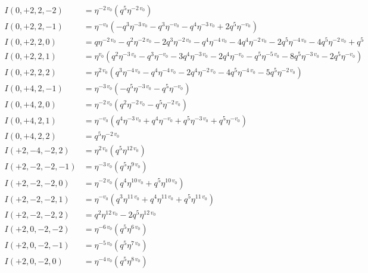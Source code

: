 \documentclass[11pt,a4paper]{article}
\begin{document}
\begin{align*}
I(0, +2, 2, -2) &= \eta^{-2 \, v_{0}} \left( q^{5} \eta^{-2 \, v_{0}} \right) \\
I(0, +2, 2, -1) &= \eta^{-v_{0}} \left( -q^{3} \eta^{-3 \, v_{0}} - q^{3} \eta^{-v_{0}} - q^{4} \eta^{-3 \, v_{0}} + 2 q^{5} \eta^{-v_{0}} \right) \\
I(0, +2, 2, 0) &= q \eta^{-2 \, v_{0}} - q^{2} \eta^{-2 \, v_{0}} - 2 q^{3} \eta^{-2 \, v_{0}} - q^{4} \eta^{-4 \, v_{0}} - 4 q^{4} \eta^{-2 \, v_{0}} - 2 q^{5} \eta^{-4 \, v_{0}} - 4 q^{5} \eta^{-2 \, v_{0}} + q^{5} \\
I(0, +2, 2, 1) &= \eta^{v_{0}} \left( q^{2} \eta^{-3 \, v_{0}} - q^{3} \eta^{-v_{0}} - 3 q^{4} \eta^{-3 \, v_{0}} - 2 q^{4} \eta^{-v_{0}} - q^{5} \eta^{-5 \, v_{0}} - 8 q^{5} \eta^{-3 \, v_{0}} - 2 q^{5} \eta^{-v_{0}} \right) \\
I(0, +2, 2, 2) &= \eta^{2 \, v_{0}} \left( q^{3} \eta^{-4 \, v_{0}} - q^{4} \eta^{-4 \, v_{0}} - 2 q^{4} \eta^{-2 \, v_{0}} - 4 q^{5} \eta^{-4 \, v_{0}} - 5 q^{5} \eta^{-2 \, v_{0}} \right) \\
I(0, +4, 2, -1) &= \eta^{-3 \, v_{0}} \left( -q^{5} \eta^{-3 \, v_{0}} - q^{5} \eta^{-v_{0}} \right) \\
I(0, +4, 2, 0) &= \eta^{-2 \, v_{0}} \left( q^{2} \eta^{-2 \, v_{0}} - q^{5} \eta^{-2 \, v_{0}} \right) \\
I(0, +4, 2, 1) &= \eta^{-v_{0}} \left( q^{4} \eta^{-3 \, v_{0}} + q^{4} \eta^{-v_{0}} + q^{5} \eta^{-3 \, v_{0}} + q^{5} \eta^{-v_{0}} \right) \\
I(0, +4, 2, 2) &= q^{5} \eta^{-2 \, v_{0}} \\
I(+2, -4, -2, 2) &= \eta^{2 \, v_{0}} \left( q^{5} \eta^{12 \, v_{0}} \right) \\
I(+2, -2, -2, -1) &= \eta^{-3 \, v_{0}} \left( q^{5} \eta^{9 \, v_{0}} \right) \\
I(+2, -2, -2, 0) &= \eta^{-2 \, v_{0}} \left( q^{4} \eta^{10 \, v_{0}} + q^{5} \eta^{10 \, v_{0}} \right) \\
I(+2, -2, -2, 1) &= \eta^{-v_{0}} \left( q^{3} \eta^{11 \, v_{0}} + q^{4} \eta^{11 \, v_{0}} + q^{5} \eta^{11 \, v_{0}} \right) \\
I(+2, -2, -2, 2) &= q^{2} \eta^{12 \, v_{0}} - 2 q^{5} \eta^{12 \, v_{0}} \\
I(+2, 0, -2, -2) &= \eta^{-6 \, v_{0}} \left( q^{5} \eta^{6 \, v_{0}} \right) \\
I(+2, 0, -2, -1) &= \eta^{-5 \, v_{0}} \left( q^{5} \eta^{7 \, v_{0}} \right) \\
I(+2, 0, -2, 0) &= \eta^{-4 \, v_{0}} \left( q^{5} \eta^{8 \, v_{0}} \right) \\

\end{align*}
\end{document}
